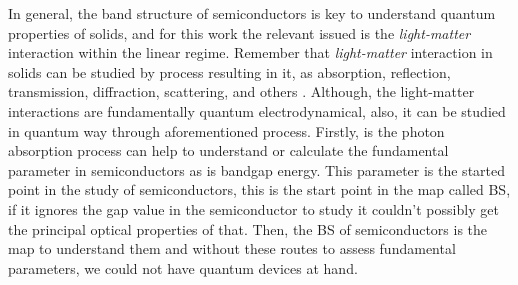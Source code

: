 In general, the band structure of semiconductors is key to understand quantum
properties of solids, and for this work the relevant issued  is the \emph{light-matter} interaction within the linear regime. Remember that \emph{light-matter} interaction in solids can be studied by process resulting in it, as absorption,
reflection, transmission, diffraction, scattering, and others \cite{rivera2020light}. Although, the light-matter
interactions are fundamentally quantum electrodynamical, also, it can be studied in quantum
way through aforementioned process. Firstly, is the photon absorption process can help
to understand or calculate the fundamental parameter in semiconductors as is bandgap
energy. This parameter is the started point in the study of semiconductors, this is the start
point in the map called \gls{BS}, if it ignores the gap value in the semiconductor to
study it couldn't possibly get the principal optical properties of that.
Then, the \gls{BS} of semiconductors is the map to understand them and without these routes to assess fundamental
parameters, we could not have quantum devices at hand.